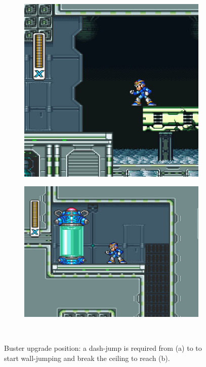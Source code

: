\begin{figure}[h]
	\centering
	\begin{subfigure}{0.3\textwidth}
		\centering
		\includegraphics[width=\linewidth]{figures/X1/Flame_mammoth/Flame_armor_1.jpg}
		\caption{}
	\end{subfigure}
	\begin{subfigure}{0.4\textwidth}
		\centering
		\includegraphics[width=\linewidth]{figures/X1/Flame_mammoth/Flame_armor_2.jpg}
		\caption{}
	\end{subfigure}\\
	\caption{Buster upgrade position: a dash-jump is required from (a) to to start wall-jumping and break the ceiling to reach (b).}
\end{figure}

